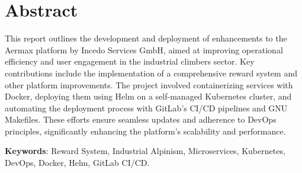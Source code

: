 \section*{Abstract}

This report outlines the development and deployment of enhancements to the Aermax platform by Incedo Services GmbH, aimed at improving operational efficiency and user engagement in the industrial climbers sector. Key contributions include the implementation of a comprehensive reward system and other platform improvements. The project involved containerizing services with Docker, deploying them using Helm on a self-managed Kubernetes cluster, and automating the deployment process with GitLab's CI/CD pipelines and GNU Makefiles. These efforts ensure seamless updates and adherence to DevOps principles, significantly enhancing the platform's scalability and performance.

\vspace{2cm}
\noindent\textbf{Keywords}: Reward System, Industrial Alpinism, Microservices, Kubernetes, DevOps, Docker, Helm, GitLab CI/CD.

\newpage